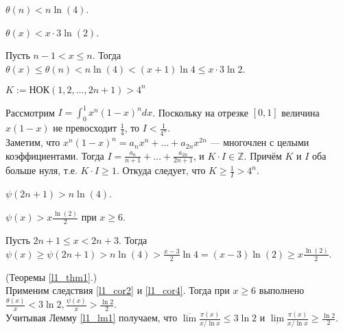\begin{corollary} \label{l1_cor1}
    $\theta(n) < n \ln(4)$.
\end{corollary}

\begin{corollary} \label{l1_cor2}
    $\theta(x) < x \cdot 3 \ln(2)$.
\end{corollary}
\begin{pf}
    Пусть $n - 1 < x \leq n$. Тогда $\theta(x) \leq \theta(n) < n \ln(4) < (x + 1) \ln 4 \leq x \cdot 3\ln 2$.
\end{pf}

\begin{lemma} \label{l1_lm3}
    $K := \text{НОК}\left( 1, 2, \ldots, 2n + 1 \right) > 4^n$
\end{lemma}
\begin{pf}
    Рассмотрим $\displaystyle I = \int_{0}^{1} x^n (1 - x)^n dx$. Поскольку на отрезке $[0, 1]$ величина $x(1 - x)$ не превосходит $\displaystyle \frac{1}{4}$, то $\displaystyle I < \frac{1}{4^n}$.\\
    Заметим, что $x^n(1 - x)^n = a_n  x^n + \ldots + a_{2n} x^{2n}$ — многочлен с целыми коэффициентами. Тогда $\displaystyle I = \frac{a_n}{n + 1} + \ldots + \frac{a_{2n}}{2n + 1}$, и $K \cdot I \in \mathbb{Z}$. Причём $K$ и $I$ оба больше нуля, т.е. $K \cdot I \geq 1$. Откуда следует, что $\displaystyle K \geq \frac{1}{I} > 4^n$.
\end{pf}

\begin{corollary} \label{l1_cor3}
    $\psi(2n+1) > n \ln(4)$.
\end{corollary}

\begin{corollary} \label{l1_cor4}
    $\psi(x) > x \frac{\ln(2)}{2}$ при $x \geq 6$.
\end{corollary}
\begin{pf}
    Пусть $2n+1 \leq x < 2n+3$. Тогда
    $\displaystyle \psi(x) \geq \psi(2n+1) > n \ln(4) > \frac{x - 3}{2} \ln 4 = (x-3) \ln(2) \geq x \frac{\ln(2)}{2}$.
\end{pf}

\begin{pf} (Теоремы \ref{l1_thm1}.)~\\
    Применим следствия \ref{l1_cor2} и \ref{l1_cor4}. Тогда при $x \geq 6$ выполнено
	$\displaystyle  \frac{\theta(x)}{x} < 3 \ln 2, \frac{\psi(x)}{x} > \frac{\ln 2}{2}$.\\
    Учитывая Лемму \ref{l1_lm1} получаем, что $\displaystyle \overline{\lim} \frac{\pi(x)}{x / \ln x} \leq 3 \ln 2$ и
    $\displaystyle \underline{\lim} \frac{\pi(x)}{x / \ln x} \geq \frac{\ln 2}{2}$.
\end{pf}

